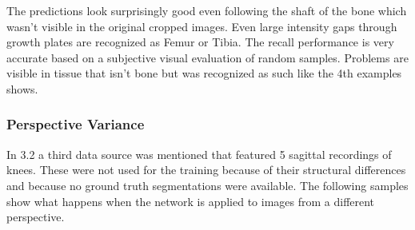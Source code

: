 The predictions look surprisingly good even following the shaft of the bone which wasn't visible in the original cropped images. Even large intensity gaps through growth plates are recognized as Femur or Tibia. The recall performance is very accurate based on a subjective visual evaluation of random samples. Problems are visible in tissue that isn't bone but was recognized as such like the 4th examples shows.

\subsubsection{Perspective Variance}

In 3.2 a third data source was mentioned that featured 5 sagittal recordings of knees. These were not used for the training because of their structural differences and because no ground truth segmentations were available. The following samples show what happens when the network is applied to images from a different perspective.

